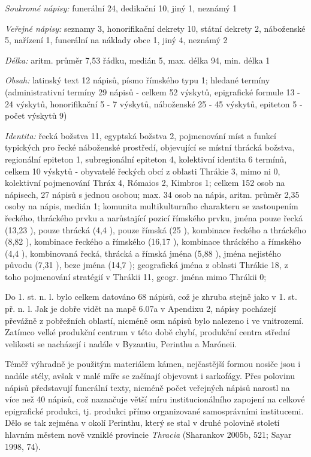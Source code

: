 {\em Soukromé nápisy:} funerální 24, dedikační 10, jiný 1, neznámý 1

{\em Veřejné nápisy:} seznamy 3, honorifikační dekrety 10, státní dekrety 2, náboženské 5, nařízení 1, funerální na náklady obce 1, jiný 4, neznámý 2

{\em Délka:} aritm. průměr 7,53 řádku, medián 5, max. délka 94, min. délka 1

{\em Obsah:} latinský text 12 nápisů, písmo římského typu 1; hledané termíny (administrativní termíny 29 nápisů - celkem 52 výskytů, epigrafické formule 13 - 24 výskytů, honorifikační 5 - 7 výskytů, náboženské 25 - 45 výskytů, epiteton 5 - počet výskytů 9)

{\em Identita:} řecká božstva 11, egyptská božstva 2, pojmenování míst a funkcí typických pro řecké náboženské prostředí, objevující se místní thrácká božstva, regionální epiteton 1, subregionální epiteton 4, kolektivní identita 6 termínů, celkem 10 výskytů - obyvatelé řeckých obcí z oblasti Thrákie 3, mimo ni 0, kolektivní pojmenování Thráx 4, Rómaios 2, Kimbros 1; celkem 152 osob na nápisech, 27 nápisů s jednou osobou; max. 34 osob na nápis, aritm. průměr 2,35 osoby na nápis, medián 1; komunita multikulturního charakteru se zastoupením řeckého, thráckého prvku a narůstající pozicí římského prvku, jména pouze řecká (13,23 ), pouze thrácká (4,4 ), pouze římská (25 ), kombinace řeckého a thráckého (8,82 ), kombinace řeckého a římského (16,17 ), kombinace thráckého a římského (4,4 ), kombinovaná řecká, thrácká a římská jména (5,88 ), jména nejistého původu (7,31 ), beze jména (14,7 ); geografická jména z oblasti Thrákie 18, z toho pojmenování stratégií v Thrákii 11, geogr. jména mimo Thrákii 0;

\NC\AR
\HL
\HL
\stoptable

Do 1. st. n. l. bylo celkem datováno 68 nápisů, což je zhruba stejně jako v 1. st. př. n. l. Jak je dobře vidět na mapě 6.07a v Apendixu 2, nápisy pocházejí převážně z pobřežních oblastí, nicméně osm nápisů bylo nalezeno i ve vnitrozemí. Zatímco velké produkční centrum v této době chybí, produkční centra střední velikosti se nacházejí i nadále v Byzantiu, Perinthu a Maróneii.

Téměř výhradně je použitým materiálem kámen, nejčastější formou nosiče jsou i nadále stély, avšak v malé míře se začínají objevovat i sarkofágy. Přes polovinu nápisů představují funerální texty, nicméně počet veřejných nápisů narostl na více než 40  nápisů, což naznačuje větší míru institucionálního zapojení na celkové epigrafické produkci, tj. produkci přímo organizované samosprávními institucemi. Dělo se tak zejména v okolí Perinthu, který se stal v druhé polovině století hlavním městem nově vzniklé provincie {\em Thracia} (Sharankov 2005b, 521; Sayar 1998, 74).

